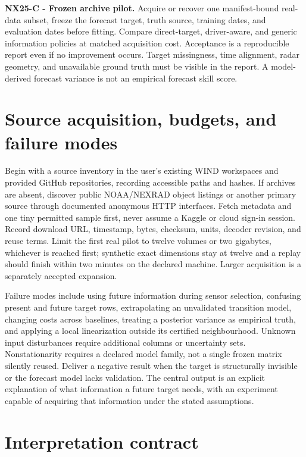 \documentclass[
  11pt,
  a4paper,
]{report}
\begin{document}
\textbf{NX25-C - Frozen archive pilot.} Acquire or recover one
manifest-bound real-data subset, freeze the forecast target, truth
source, training dates, and evaluation dates before fitting. Compare
direct-target, driver-aware, and generic information policies at matched
acquisition cost. Acceptance is a reproducible report even if no
improvement occurs. Target missingness, time alignment, radar geometry,
and unavailable ground truth must be visible in the report. A
model-derived forecast variance is not an empirical forecast skill
score.

\hypertarget{source-acquisition-budgets-and-failure-modes}{%
\section{Source acquisition, budgets, and failure
modes}\label{source-acquisition-budgets-and-failure-modes}}

Begin with a source inventory in the user's existing WIND workspaces and
provided GitHub repositories, recording accessible paths and hashes. If
archives are absent, discover public NOAA/NEXRAD object listings or
another primary source through documented anonymous HTTP interfaces.
Fetch metadata and one tiny permitted sample first, never assume a
Kaggle or cloud sign-in session. Record download URL, timestamp, bytes,
checksum, units, decoder revision, and reuse terms. Limit the first real
pilot to twelve volumes or two gigabytes, whichever is reached first;
synthetic exact dimensions stay at twelve and a replay should finish
within two minutes on the declared machine. Larger acquisition is a
separately accepted expansion.

Failure modes include using future information during sensor selection,
confusing present and future target rows, extrapolating an unvalidated
transition model, changing costs across baselines, treating a posterior
variance as empirical truth, and applying a local linearization outside
its certified neighbourhood. Unknown input disturbances require
additional columns or uncertainty sets. Nonstationarity requires a
declared model family, not a single frozen matrix silently reused.
Deliver a negative result when the target is structurally invisible or
the forecast model lacks validation. The central output is an explicit
explanation of what information a future target needs, with an
experiment capable of acquiring that information under the stated
assumptions.

\hypertarget{interpretation-contract}{%
\section{Interpretation contract}\label{interpretation-contract}}
\end{document}
